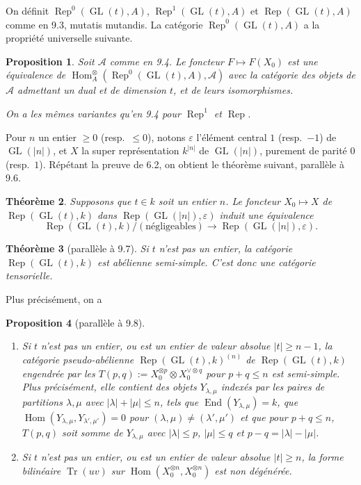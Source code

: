 \documentclass[11pt,a4paper]{article}
\theoremstyle{plain}
\newtheorem{theorem}{Th\'eor\`eme}[section]
\newtheorem{proposition}[theorem]{Proposition}
\theoremstyle{definition}
\DeclareMathOperator{\Hom}{Hom}
\DeclareMathOperator{\End}{End}
\DeclareMathOperator{\Tr}{Tr}
\DeclareMathOperator{\Rep}{Rep}
\DeclareMathOperator{\GL}{GL}
\newcommand{\eps}{\varepsilon}
\begin{document}
On d\'efinit $\Rep^0(\GL(t), A)$, $\Rep^1(\GL(t), A)$ et $\Rep(\GL(t), A)$ comme en 9.3, mutatis mutandis. La cat\'egorie $\Rep^0(\GL(t), A)$ a la propri\'et\'e universelle suivante.

\begin{proposition}
Soit $\mathcal{A}$ comme en 9.4. Le foncteur $F \mapsto F(X_0)$ est une \'equivalence de $\Hom^{\otimes}_A(\Rep^0(\GL(t), A), \mathcal{A})$ avec la cat\'egorie des objets de $\mathcal{A}$ admettant un dual et de dimension $t$, et de leurs isomorphismes.

On a les m\^emes variantes qu'en 9.4 pour $\Rep^1$ et $\Rep$.
\end{proposition}

Pour $n$ un entier $\geq 0$ (resp.~$\leq 0$), notons $\eps$ l'\'el\'ement central $1$ (resp.~$-1$) de $\GL(|n|)$, et $X$ la super repr\'esentation $k^{|n|}$ de $\GL(|n|)$, purement de parit\'e $0$ (resp.~$1$). R\'ep\'etant la preuve de 6.2, on obtient le th\'eor\`eme suivant, parall\`ele \`a 9.6.

\begin{theorem}
Supposons que $t \in k$ soit un entier $n$. Le foncteur $X_0 \mapsto X$ de $\Rep(\GL(t), k)$ dans $\Rep(\GL(|n|), \eps)$ induit une \'equivalence
\[
\Rep(\GL(t), k)/(\text{n\'egligeables}) \to \Rep(\GL(|n|), \eps).
\]
\end{theorem}

\begin{theorem}[parall\`ele \`a 9.7]
Si $t$ n'est pas un entier, la cat\'egorie $\Rep(\GL(t), k)$ est ab\'elienne semi-simple. C'est donc une cat\'egorie tensorielle.
\end{theorem}

Plus pr\'ecis\'ement, on a

\begin{proposition}[parall\`ele \`a 9.8]
\begin{enumerate}[label=(\roman*)]
\item Si $t$ n'est pas un entier, ou est un entier de valeur absolue $|t| \geq n - 1$, la cat\'egorie pseudo-ab\'elienne $\Rep(\GL(t), k)^{(n)}$ de $\Rep(\GL(t), k)$ engendr\'ee par les $T(p, q) := X_0^{\otimes p} \otimes X_0^{\vee \otimes q}$ pour $p + q \leq n$ est semi-simple. Plus pr\'ecis\'ement, elle contient des objets $Y_{\lambda, \mu}$ index\'es par les paires de partitions $\lambda, \mu$ avec $|\lambda| + |\mu| \leq n$, tels que $\End(Y_{\lambda, \mu}) = k$, que $\Hom(Y_{\lambda, \mu}, Y_{\lambda', \mu'}) = 0$ pour $(\lambda, \mu) \neq (\lambda', \mu')$ et que pour $p + q \leq n$, $T(p, q)$ soit somme de $Y_{\lambda, \mu}$ avec $|\lambda| \leq p$, $|\mu| \leq q$ et $p - q = |\lambda| - |\mu|$.
\item Si $t$ n'est pas un entier, ou est un entier de valeur absolue $|t| \geq n$, la forme bilin\'eaire $\Tr(uv)$ sur $\Hom(X_0^{\otimes n}, X_0^{\otimes n})$ est non d\'eg\'en\'er\'ee.
\end{enumerate}
\end{proposition}
\end{document}
